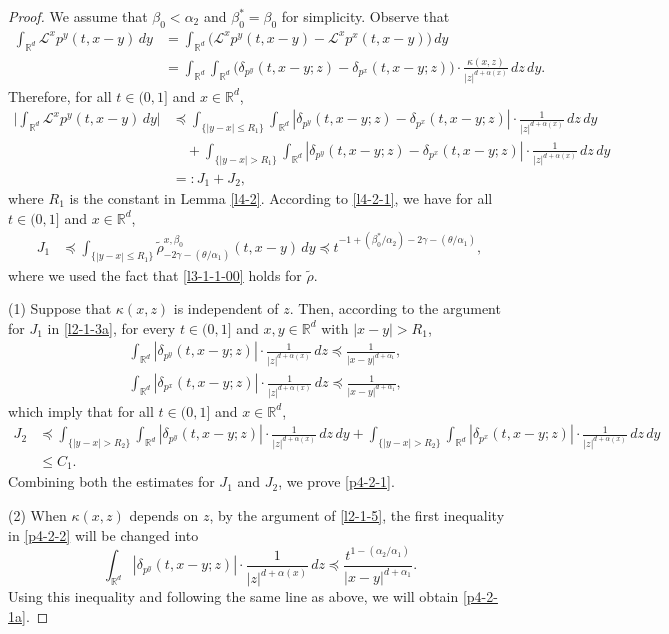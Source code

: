 \documentclass[a4paper,11pt]{amsart}
\renewcommand{\le}{\leqslant}
\newcommand{\R}{\mathds R}
\newcommand{\B}{\beta}
\newcommand{\T}{\theta}
\newcommand{\p}{\preceq}
\newcommand{\K}{\kappa}
\newcommand{\A}{\alpha}
\newcommand{\G}{\gamma}
\def\LL{{\mathcal L}}
\theoremstyle{definition}
\begin{document}
\begin{proof} We assume that $\B_0<\alpha_2$ and $\B_0^*=\B_0$ for simplicity.
Observe that
\begin{align*}
 \int_{\R^d}  \LL^xp^y(t,x-y)\,dy
&=\int_{\R^d}\big( \LL^xp^y(t,x-y)- \LL^xp^x(t,x-y)\big)\,dy\\
&=\int_{\R^d}
\int_{\R^d}\big(\delta_{p^y}(t,x-y;z)
-\delta_{p^x}(t,x-y;z)\big)\cdot\frac{\K(x,z)}{|z|^{d+\A(x)}}\,dz\,dy.
\end{align*}
Therefore, for all $t\in (0,1]$ and $x\in \R^d$,
\begin{align*}
 \Big|\int_{\R^d}  \LL^xp^y(t,x-y)\,dy\Big|
&\p \int_{\{|y-x|\le R_1\}}\int_{\R^d}
|\delta_{p^y}(t,x-y;z)
-\delta_{p^x}(t,x-y;z)|\cdot \frac{1}{|z|^{d+\A(x)}}\,dz\,dy\\
&\quad+\int_{\{|y-x|>R_1\}}\int_{\R^d}|\delta_{p^y}(t,x-y;z)
-\delta_{p^x}(t,x-y;z)|\cdot \frac{1}{|z|^{d+\A(x)}}\,dz\,dy\\
&=:J_1+J_2,
\end{align*}
where $R_1$ is the constant in Lemma \ref{l4-2}.
According to \eqref{l4-2-1}, we have for all $t\in (0,1]$ and $x\in \R^d$,
\begin{align*}
J_1& \p \int_{\{|y-x|\le R_1\}}\tilde \rho^{x,\B_0}_{-2\G-({\T}/{\A_1})}(t,x-y)\,dy
\p t^{-1+(\B_0^*/\A_2)-2\G-({\theta}/{\A_1})},
\end{align*}
where we used the fact that \eqref{l3-1-1-00} holds for $\tilde \rho$.

(1) Suppose that $\K(x,z)$ is independent of $z$. Then, according to the argument for $J_1$ in  \eqref{l2-1-3a}, for every $t \in (0,1]$ and $x,y\in \R^d$ with $|x-y|>R_1$,
\begin{equation}\label{p4-2-2} \begin{split}
&\int_{\R^d}|\delta_{p^y}(t,x-y;z)|\cdot \frac{1}{|z|^{d+\A(x)}}\,dz\p \frac{1}{|x-y|^{d+\A_1}},\\
& \int_{\R^d}|\delta_{p^x}(t,x-y;z)|\cdot \frac{1}{|z|^{d+\A(x)}}\,dz\p \frac{1}{|x-y|^{d+\A_1}},\end{split}
\end{equation}
which imply that for all $t\in (0,1]$ and $x\in \R^d$,
\begin{align*}
J_2&\p \int_{\{|y-x|>R_2\}}\int_{\R^d}
|\delta_{p^y}(t,x-y;z)|\cdot \frac{1}{|z|^{d+\A(x)}}\,dz\,dy +\int_{\{|y-x|>R_2\}}\int_{\R^d}
|\delta_{p^x}(t,x-y;z)|\cdot \frac{1}{|z|^{d+\A(x)}}\,dz\,dy\\
&\le C_1.
\end{align*}
Combining both the estimates for $J_1$ and $J_2$, we prove \eqref{p4-2-1}.

(2) When $\K(x,z)$ depends on $z$, by the argument of \eqref{l2-1-5}, the first inequality in \eqref{p4-2-2} will be changed into
\begin{equation*}
\int_{\R^d}|\delta_{p^y}(t,x-y;z)|\cdot \frac{1}{|z|^{d+\A(x)}}\,dz\p
\frac{t^{1-{(\A_2/\A_1)}}}{|x-y|^{d+\A_1}}.
\end{equation*}
Using this inequality and following the same line as above, we will obtain \eqref{p4-2-1a}.
\end{proof}
\end{document}

